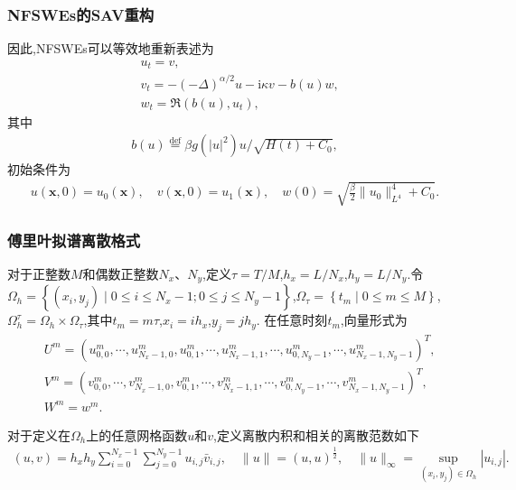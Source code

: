 \documentclass[aspectratio=169]{beamer}
\begin{document}
\begin{frame}\frametitle{NFSWEs的SAV重构}
因此,NFSWEs可以等效地重新表述为
\begin{align}
& u_t=v, \label{eq_SAVRRK:2-2}\\
& v_t=-(-\Delta)^{\alpha / 2} u-\mathrm{i}\kappa v-b(u) w, \label{eq_SAVRRK:2-3}\\
& w_t=\Re\left(b(u), u_t\right),\label{eq_SAVRRK:2-4}
\end{align}
其中
\begin{align}
b(u)\overset{\text{def}}{=}\beta g(|u|^2) u / \sqrt{H(t)+C_0},
\end{align}
初始条件为
\begin{align}\label{eq_SAVRRK:31}
	u(\boldsymbol{x}, 0)=u_{0}(\boldsymbol{x}), \quad v(\boldsymbol{x}, 0)=u_{1}(\boldsymbol{x}), \quad w(0)=\sqrt{\frac{\beta}{2}\|u_{0}\|_{L^{4}}^{4} +C_0}.
\end{align}
\end{frame}


\begin{frame}\frametitle{傅里叶拟谱离散格式}
	对于正整数$M$和偶数正整数$N_{x}$、$N_{y}$,定义$\tau={T}/{M}$,$h_{x}={L}/{N_{x}}$,$h_{y}={L}/{N_{y}}$.令$\Omega_{h}=\left\{(x_{i}, y_{j}) \mid 0 \leq i \leq N_x-1;0 \leq j \leq N_y-1\right\}$,$\Omega_{\tau}=\left\{t_{m} \mid 0 \leq m \leq M\right\}$,$\Omega_{h}^{\tau}=\Omega_{h} \times \Omega_{\tau}$,其中$t_{m}=m \tau$,$x_{i}=i h_{x}$,$y_{j}=j h_{y}$.
	在任意时刻$t_m$,向量形式为
	\begin{align}\label{eq_SAVRRK:47}
	&U^m=\left(u_{0,0}^m, \cdots, u_{N_{x}-1,0}^m, u_{0,1}^m, \cdots, u_{N_{x}-1,1}^m, \cdots, u_{0, N_{y}-1}^m, \cdots, u_{N_{x}-1, N_{y}-1}^m\right)^{T},\\
	&V^m=\left(v_{0,0}^m, \cdots, v_{N_{x}-1,0}^m, v_{0,1}^m, \cdots, v_{N_{x}-1,1}^m, \cdots, v_{0, N_{y}-1}^m, \cdots, v_{N_{x}-1, N_{y}-1}^m\right)^{T},\\
	&W^m=w^m.
	\end{align}
	
	对于定义在$\Omega_{h}$上的任意网格函数$u$和$v$,定义离散内积和相关的离散范数如下
	\begin{align}\label{eq_SAVRRK:48}
	(u, v)=h_{x} h_{y} \sum_{i=0}^{N_{x}-1} \sum_{j=0}^{N_{y}-1} u_{i, j} \bar{v}_{i, j},\quad\|u\|=(u, u)^{\frac{1}{2}},\quad\|u\|_{\infty}=\sup _{\left(x_{i}, y_{j}\right) \in \Omega_{h}}\left|u_{i, j}\right|.
	\end{align}
	
\end{frame}
\end{document}
